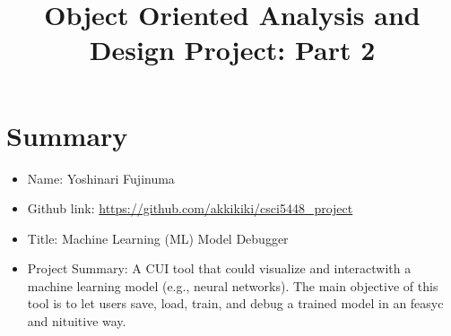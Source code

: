 \documentclass[11pt]{article}
\begin{document}
\vspace{-1cm}
\title{\vspace{-2ex} Object Oriented Analysis and Design Project: Part 2\vspace{-2ex}}
\date{\vspace{-6ex}}
\maketitle


\section{Summary}
\begin{itemize}[leftmargin=4\parindent,itemsep=-1ex]
 \item Name: Yoshinari Fujinuma
 \item Github link: \url{https://github.com/akkikiki/csci5448_project}
 \item Title: Machine Learning (ML) Model Debugger
 \item Project Summary: A CUI tool that could visualize and interactwith a  machine learning model (e.g., neural networks). The main objective of this tool is to let users save, load, train, and debug a trained model in an feasyc and nituitive way. 
\end{itemize}

\end{document}

